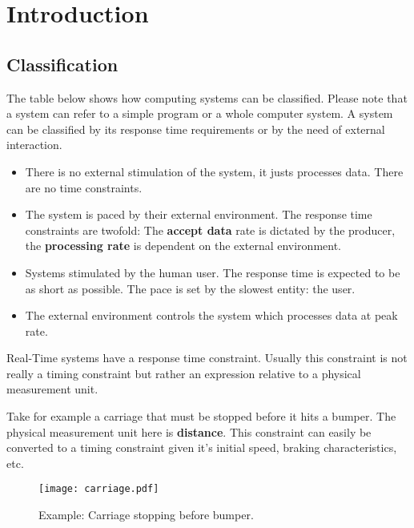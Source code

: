 \documentclass[../main.tex]{subfiles}
\begin{document}
\chapter{Introduction}

\section{Classification}

The table below shows how computing systems can be classified. Please note that a system can refer to a simple program or a whole computer system. A system can be classified by its response time requirements or by the need of external interaction. 

\begin{itemize}
	\item {} 
	There is no external stimulation of the system, it justs processes data. There are no time constraints.
	\item {}
	The system is paced by their external environment. The response time constraints are twofold: The \textbf{accept data} rate is dictated by the producer, the \textbf{processing rate} is dependent on the external environment.
	\item {}
	Systems stimulated by the human user. The response time is expected to be as short as possible. The pace is set by the slowest entity: the user.
	\item {}
	The external environment controls the system which processes data at peak rate.
\end{itemize}

Real-Time systems have a response time constraint. Usually this constraint is not really a timing constraint but rather an expression relative to a physical measurement unit.

\begin{exmp}
Take for example a carriage that must be stopped before it hits a bumper. The physical measurement unit here is \textbf{distance}. This constraint can easily be converted to a timing constraint given it's initial speed, braking characteristics, etc. 
\begin{figure}[H]
    \centering
    \texttt{[image: carriage.pdf]}
    \caption{Example: Carriage stopping before bumper.}
    \label{carriage}
\end{figure}
\end{exmp}
\end{document}
